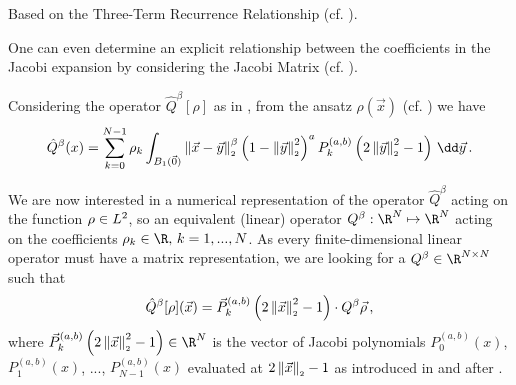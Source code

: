 Based on the Three-Term Recurrence Relationship (cf. ).

One can even determine an explicit relationship between the coefficients
in the Jacobi expansion by considering the Jacobi Matrix (cf. ).

Considering the operator $\hat{Q}^\beta[\rho]$ as in , from the ansatz $\rho(\vec{x})$ (cf. ) we have
\begin{equation}
  \hat{Q}^{\beta}(x) = \sum_{k=0}^{N-1} \rho_{k} \int_{B_1(\vec{0})} \norm{\vec{x}-\vec{y}}^{\beta} \weight{y}\jacobi{y} \,\dd\vec{y}\,.
  \label{eq:theorem216-in-derivation}
\end{equation}

We are now interested in a numerical representation of the operator $\hat{Q}^\beta$ acting on the function $\rho \in L^2$, so an equivalent (linear) operator $Q^\beta: \R^N \mapsto \R^N$ acting on the coefficients $\rho_k \in \R,\, k = 1, ..., N$.
As every finite-dimensional linear operator must have a matrix representation, we are looking for a $Q^\beta \in \R^{N \times N}$ such that
$$\hat{Q}^\beta[\rho](\vec{x}) = \vec{P}_{k}^{(a, b)}\left(2 \left\lVert\vec{x}\right\rVert_{\scriptscriptstyle 2}^2 - 1\right) \cdot Q^\beta \vec{\rho}\,,$$
where $\jacobivec{x} \in \R^N$ is the vector of Jacobi polynomials $P^{(a, b)}_0(x)$, $P^{(a, b)}_1(x)$, ..., $P^{(a, b)}_{N-1}(x)$ evaluated at $2\left\lVert\vec{x}\right\rVert_{\scriptscriptstyle 2} - 1$ as introduced in and after .

